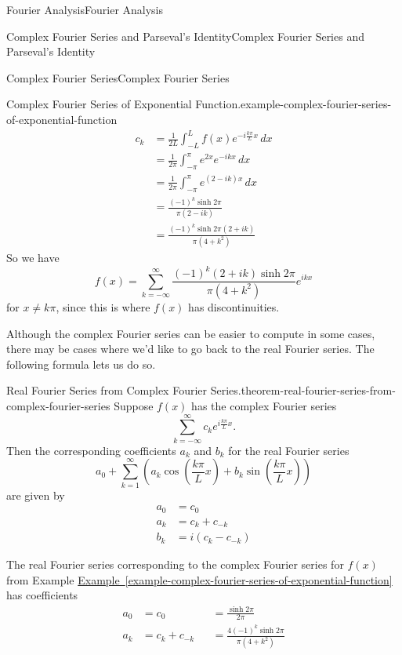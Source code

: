 \documentclass[10pt,]{book}
\numberwithin{equation}{section}
\begin{document}
\begin{chapterptx}{Fourier Analysis}{}{Fourier Analysis}{}{}
\begin{sectionptx}{Complex Fourier Series and Parseval's Identity}{}{Complex Fourier Series and Parseval's Identity}{}{}
\begin{subsectionptx}{Complex Fourier Series}{}{Complex Fourier Series}{}{}
\begin{example}{Complex Fourier Series of Exponential Function.}{example-complex-fourier-series-of-exponential-function}
\begin{align*}
c_{k} & = \frac{1}{2L}\int_{-L}^{L}f(x)e^{-i\frac{k\pi}{L}x}\,dx\\
& = \frac{1}{2\pi}\int_{-\pi}^{\pi}e^{2x}e^{-ikx}\,dx \\
& = \frac{1}{2\pi}\int_{-\pi}^{\pi}e^{(2-ik)x}\,dx \\
& = \frac{(-1)^{k}\sinh2\pi}{\pi(2-ik)} \\
& = \frac{(-1)^{k}\sinh2\pi(2+ik)}{\pi(4+k^{2})}
\end{align*}
So we have%
\begin{equation*}
f(x) = \sum_{k=-\infty}^{\infty}\frac{(-1)^{k}(2+ik)\sinh2\pi}{\pi(4+k^{2})}e^{ikx}
\end{equation*}
for \(x\neq k\pi\), since this is where \(f(x)\) has discontinuities.%
\end{example}
\hypertarget{p-413}{}%
Although the complex Fourier series can be easier to compute in some cases, there may be cases where we'd like to go back to the real Fourier series. The following formula lets us do so.%
\begin{theorem}{Real Fourier Series from Complex Fourier Series.}{}{theorem-real-fourier-series-from-complex-fourier-series}%
\hypertarget{p-414}{}%
Suppose \(f(x)\) has the complex Fourier series%
\begin{equation*}
\sum_{k=-\infty}^{\infty}c_{k}e^{i\frac{k\pi}{L}x}.
\end{equation*}
Then the corresponding coefficients \(a_{k}\) and \(b_{k}\) for the real Fourier series%
\begin{equation*}
a_{0} + \sum_{k=1}^{\infty}\left(a_{k}\cos\left(\frac{k\pi}{L}x\right)+b_{k}\sin\left(\frac{k\pi}{L}x\right)\right)
\end{equation*}
are given by%
\begin{align*}
a_{0} & = c_{0} \\
a_{k} & = c_{k} + c_{-k} \\
b_{k} & = i(c_{k}-c_{-k}) 
\end{align*}
%
\end{theorem}
\hypertarget{p-415}{}%
The real Fourier series corresponding to the complex Fourier series for \(f(x)\) from Example \hyperref[example-complex-fourier-series-of-exponential-function]{Example~\ref{example-complex-fourier-series-of-exponential-function}} has coefficients%
\begin{align*}
a_{0} & = c_{0} & &= \frac{\sinh2\pi}{2\pi} \\
a_{k} & = c_{k} + c_{-k} & &= \frac{4(-1)^{k}\sinh2\pi}{\pi(4+k^{2})} \\

\end{align*}
\end{subsectionptx}
\end{sectionptx}
\end{chapterptx}
\end{document}
